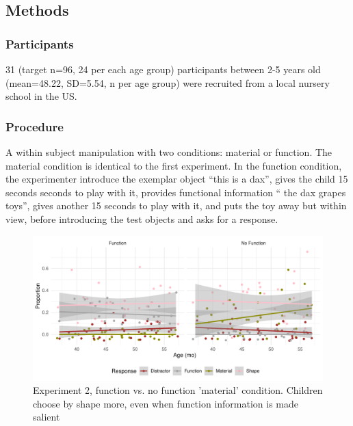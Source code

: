 \documentclass[10pt, letterpaper]{article}
\begin{document}
\subsection{Methods}\label{methods-1}

\subsubsection{Participants}\label{participants-1}

31 (target n=96, 24 per each age group) participants between 2-5 years
old (mean=48.22, SD=5.54, n per age group) were recruited from a local
nursery school in the US.

\subsubsection{Procedure}\label{procedure-1}

A within subject manipulation with two conditions: material or function.
The material condition is identical to the first experiment. In the
function condition, the experimenter introduce the exemplar object
``this is a dax'', gives the child 15 seconds seconds to play with it,
provides functional information `` the dax grapes toys'', gives another
15 seconds to play with it, and puts the toy away but within view,
before introducing the test objects and asks for a response.

\begin{CodeChunk}
\begin{figure}[!h]
\includegraphics[width=1\linewidth]{figs/jitter_function-1} \caption[Experiment 2, function vs]{Experiment 2, function vs. no function 'material'  condition. Children choose by shape more, even when function information is made salient}\label{fig:jitter_function}
\end{figure}
\end{CodeChunk}
\end{document}
